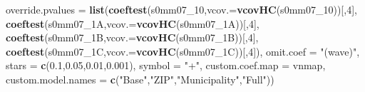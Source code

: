 \documentclass[
]{article}
\newenvironment{Shaded}{\begin{snugshade}}{\end{snugshade}}
\newcommand{\DataTypeTok}[1]{\textcolor[rgb]{0.13,0.29,0.53}{#1}}
\newcommand{\DecValTok}[1]{\textcolor[rgb]{0.00,0.00,0.81}{#1}}
\newcommand{\FloatTok}[1]{\textcolor[rgb]{0.00,0.00,0.81}{#1}}
\newcommand{\KeywordTok}[1]{\textcolor[rgb]{0.13,0.29,0.53}{\textbf{#1}}}
\newcommand{\NormalTok}[1]{#1}
\newcommand{\StringTok}[1]{\textcolor[rgb]{0.31,0.60,0.02}{#1}}
\begin{document}
\begin{Shaded}
\begin{Highlighting}[]
          \DataTypeTok{override.pvalues =} \KeywordTok{list}\NormalTok{(}\KeywordTok{coeftest}\NormalTok{(s0mm07_}\DecValTok{10}\NormalTok{,}\DataTypeTok{vcov.=}\KeywordTok{vcovHC}\NormalTok{(s0mm07_}\DecValTok{10}\NormalTok{))[,}\DecValTok{4}\NormalTok{],}
                                  \KeywordTok{coeftest}\NormalTok{(s0mm07_1A,}\DataTypeTok{vcov.=}\KeywordTok{vcovHC}\NormalTok{(s0mm07_1A))[,}\DecValTok{4}\NormalTok{],}
                                  \KeywordTok{coeftest}\NormalTok{(s0mm07_1B,}\DataTypeTok{vcov.=}\KeywordTok{vcovHC}\NormalTok{(s0mm07_1B))[,}\DecValTok{4}\NormalTok{],}
                                  \KeywordTok{coeftest}\NormalTok{(s0mm07_1C,}\DataTypeTok{vcov.=}\KeywordTok{vcovHC}\NormalTok{(s0mm07_1C))[,}\DecValTok{4}\NormalTok{]),}
          \DataTypeTok{omit.coef =} \StringTok{"(wave)"}\NormalTok{, }\DataTypeTok{stars =} \KeywordTok{c}\NormalTok{(}\FloatTok{0.1}\NormalTok{,}\FloatTok{0.05}\NormalTok{,}\FloatTok{0.01}\NormalTok{,}\FloatTok{0.001}\NormalTok{), }\DataTypeTok{symbol =} \StringTok{"+"}\NormalTok{,}
          \DataTypeTok{custom.coef.map =}\NormalTok{ vnmap, }
          \DataTypeTok{custom.model.names =} \KeywordTok{c}\NormalTok{(}\StringTok{"Base"}\NormalTok{,}\StringTok{"ZIP"}\NormalTok{,}\StringTok{"Municipality"}\NormalTok{,}\StringTok{"Full"}\NormalTok{))}
\end{Highlighting}
\end{Shaded}
\end{document}
